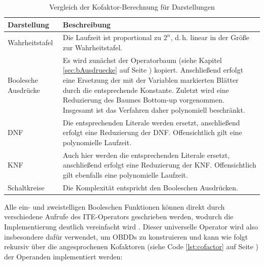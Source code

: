 \begin{table}[bth]
	\centering
	\caption{Vergleich der Kofaktor-Berechnung für Darstellungen}
	\label{tab:cofactor}
	\begin{tabular}{ | l | p{10cm} | }
		\hline
		\textbf{Darstellung} & \textbf{Beschreibung} \\ \hline
		Wahrheitstafel & Die Laufzeit ist proportional zu $2^n$, d.\,h. linear in der Größe zur Wahrheitstafel.\\ \hline
		Boolesche Ausdrücke & Es wird zunächst der Operatorbaum (siehe Kapitel \ref{sec:bAusdruecke} auf Seite \pageref{sec:bAusdruecke}) kopiert. Anschließend erfolgt eine Ersetzung der mit der Variablen markierten Blätter durch die entsprechende Konstante. Zuletzt wird eine Reduzierung des Baumes \glqq Bottom-up\grqq{} vorgenommen. Insgesamt ist das Verfahren daher polynomiell beschränkt. \\ \hline
		DNF & Die entsprechenden Literale werden ersetzt, anschließend erfolgt eine Reduzierung der DNF. Offensichtlich gilt eine polynomielle Laufzeit. \\ \hline
		KNF & Auch hier werden die entsprechenden Literale ersetzt, anschließend erfolgt eine Reduzierung der KNF. Offensichtlich gilt ebenfalls eine polynomielle Laufzeit. \\ \hline
		Schaltkreise & Die Komplexität entspricht den Booleschen Ausdrücken. \\ \hline
	\end{tabular}
\end{table}
\noindent 
Alle ein- und zweistelligen Booleschen Funktionen können direkt durch verschiedene Aufrufe des ITE-Operators geschrieben werden, wodurch die Implementierung deutlich vereinfacht wird \cite{brb2007}. Dieser universelle Operator wird also insbesondere dafür verwendet, um OBDDs zu konstruieren und kann wie folgt rekursiv über die angesprochenen Kofaktoren (siehe Code \ref{lst:cofactor} auf Seite \pageref{lst:cofactor}) der Operanden implementiert werden:
\lstset{language=xml}
